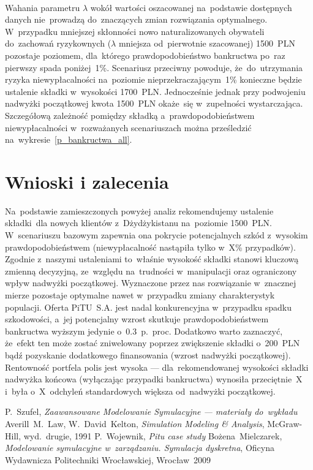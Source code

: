 \documentclass[12pt, a4paper, oneside]{mwart} %
\begin{document}
\paragraph{}
Wahania parametru $\lambda$ wokół wartości oszacowanej na~podstawie dostępnych danych nie~prowadzą do~znaczących zmian rozwiązania optymalnego. W~przypadku mniejszej skłonności nowo naturalizowanych obywateli do~zachowań ryzykownych ($\lambda$ mniejsza od~pierwotnie szacowanej) 1500~PLN pozostaje poziomem, dla~którego prawdopodobieństwo bankructwa po~raz pierwszy spada poniżej~1\%. Scenariusz przeciwny powoduje, że~do~utrzymania ryzyka niewypłacalności na~poziomie nieprzekraczającym~1\% konieczne będzie ustalenie składki w~wysokości 1700~PLN. Jednocześnie jednak przy podwojeniu nadwyżki początkowej kwota 1500~PLN okaże~się w~zupełności wystarczająca. Szczegółową zależność pomiędzy składką a~prawdopodobieństwem niewypłacalności w~rozważanych scenariuszach można prześledzić na~wykresie~\ref{p_bankructwa_all}.

\section{Wnioski i zalecenia}
Na~podstawie zamieszczonych powyżej analiz rekomendujemy ustalenie składki~dla nowych klientów z~Dżydżykistanu na~poziomie 1500~PLN. W~scenariuszu bazowym zapewnia ona pokrycie potencjalnych szkód z~wysokim prawdopodobieństwem (niewypłacalność nastąpiła tylko w~X\% przypadków). Zgodnie z~naszymi ustaleniami to~właśnie wysokość składki stanowi kluczową zmienną decyzyjną, ze~względu na~trudności w~manipulacji oraz ograniczony wpływ nadwyżki początkowej. Wyznaczone przez nas rozwiązanie w~znacznej mierze pozostaje optymalne nawet w~przypadku zmiany charakterystyk populacji. Oferta PiTU~S.A. jest nadal konkurencyjna w~przypadku spadku szkodowości, a~jej potencjalny wzrost skutkuje prawdopodobieństwem bankructwa wyższym jedynie o~0.3~p.~proc. Dodatkowo warto zaznaczyć, że~efekt ten może zostać zniwelowany poprzez zwiększenie składki o~200~PLN bądź pozyskanie dodatkowego finansowania (wzrost nadwyżki początkowej). Rentowność portfela polis jest wysoka --- dla~rekomendowanej wysokości składki nadwyżka końcowa (wyłączając przypadki bankructwa) wynosiła przeciętnie~X i~była o~X~odchyleń standardowych większa od~nadwyżki początkowej.

\begin{thebibliography}{9}
P.~Szufel, \emph{Zaawansowane Modelowanie Symulacyjne --- materiały do~wykładu}
Averill~M.~Law, W.~David~Kelton,
\emph{Simulation Modeling \& Analysis},
McGraw-Hill, wyd.~drugie, 1991
P.~Wojewnik, \emph{Pitu case study}
Bożena~Mielczarek, \emph{Modelowanie symulacyjne w~zarządzaniu. Symulacja dyskretna},
Oficyna Wydawnicza Politechniki Wrocławskiej, Wrocław~2009
\end{thebibliography}
\end{document}
